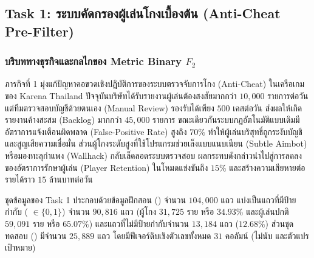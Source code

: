 \clearpage
\subsection{Task 1: ระบบคัดกรองผู้เล่นโกงเบื้องต้น (Anti-Cheat Pre-Filter)}
\label{subsec:task1}

\subsubsection{\texorpdfstring{บริบททางธุรกิจและกลไกของ Metric Binary $F_2$}{บริบททางธุรกิจและกลไกของ Metric Binary F2}}

ภารกิจที่ 1 มุ่งแก้ปัญหาคอขวดเชิงปฏิบัติการของระบบตรวจจับการโกง (Anti-Cheat) ในเครือเกมของ Karena Thailand ปัจจุบันบริษัทได้รับรายงานผู้เล่นต้องสงสัยมากกว่า $10,000$ รายการต่อวัน แต่ทีมตรวจสอบบัญชีด้วยตนเอง (Manual Review) รองรับได้เพียง $500$ เคสต่อวัน ส่งผลให้เกิดรายงานค้างสะสม (Backlog) มากกว่า $45,000$ รายการ ขณะเดียวกันระบบกฎอัตโนมัติแบบเดิมมีอัตราการแจ้งเตือนผิดพลาด (False-Positive Rate) สูงถึง $70\%$ ทำให้ผู้เล่นบริสุทธิ์ถูกระงับบัญชีและสูญเสียความเชื่อมั่น ส่วนผู้โกงระดับสูงที่ใช้โปรแกรมช่วยเล็งแบบแนบเนียน (Subtle Aimbot) หรือมองทะลุกำแพง (Wallhack) กลับเล็ดลอดระบบตรวจสอบ ผลกระทบดังกล่าวนำไปสู่การลดลงของอัตราการรักษาผู้เล่น (Player Retention) ในโหมดแข่งขันถึง $15\%$ และสร้างความเสียหายต่อรายได้ราว $15$ ล้านบาทต่อวัน

ชุดข้อมูลของ Task 1 ประกอบด้วยข้อมูลฝึกสอน () จำนวน $104,000$ แถว แบ่งเป็นแถวที่มีป้ายกำกับ ( $\in \{0, 1\}$) จำนวน $90,816$ แถว (ผู้โกง $31,725$ ราย หรือ $34.93\%$ และผู้เล่นปกติ $59,091$ ราย หรือ $65.07\%$) และแถวที่ไม่มีป้ายกำกับจำนวน $13,184$ แถว ($12.68\%$) ส่วนชุดทดสอบ () มีจำนวน $25,889$ แถว โดยมีฟีเจอร์ดิบเชิงตัวเลขทั้งหมด $31$ คอลัมน์ (ไม่นับ  และตัวแปรเป้าหมาย)

